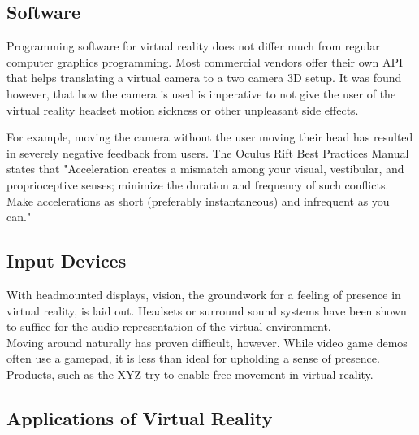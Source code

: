 \documentclass[11pt]{article}
\begin{document}
	\subsection{Software}
		Programming software for virtual reality does not differ much from regular computer graphics programming. Most commercial vendors offer their own API that helps translating a virtual camera to a two camera 3D setup. It was found however, that how the camera is used is imperative to not give the user of the virtual reality headset motion sickness or other unpleasant side effects. \cite{seppanen14}
		
		
		For example, moving the camera without the user moving their head has resulted in severely negative feedback from users. The Oculus Rift Best Practices Manual states that "Acceleration creates a mismatch among your visual, vestibular, and proprioceptive senses; minimize the duration and frequency of such conflicts. Make accelerations as short (preferably instantaneous) and infrequent as you can." \cite{yao2014oculus}
	
	\subsection{Input Devices}
	With headmounted displays, vision, the groundwork for a feeling of presence in virtual reality, is laid out. Headsets or surround sound systems have been shown to suffice for the audio representation of the virtual environment.\\
	Moving around naturally has proven difficult, however. While video game demos often use a gamepad, it is less than ideal for upholding a sense of presence. Products, such as the XYZ try to enable free movement in virtual reality.
	
	\subsection{Applications of Virtual Reality}



	
	
\end{document}
